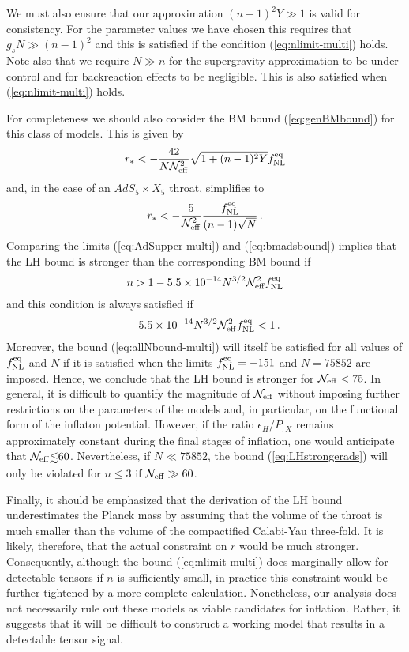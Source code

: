 {We must also ensure that our approximation $(n-1)^2Y \gg 1$ 
is valid for consistency.  
For the parameter values we have chosen this requires that 
$g_s N \gg  (n-1)^2$ 
and this is satisfied if the condition (\ref{eq:nlimit-multi}) 
holds. Note also that we require $N \gg n$ for the supergravity 
approximation to be under control and for backreaction effects to 
be negligible. This is also satisfied when (\ref{eq:nlimit-multi})  
holds. 


For completeness we should also consider the 
BM bound (\ref{eq:genBMbound}) for this class of models. This is given by 
% 
\begin{equation}
\label{eq:BMAdS-multi}
r_* < -\frac{42}{N \mathcal{N}_\mathrm{eff}^2}\sqrt{1 +(n-1)^2Y}f_{\mathrm{NL}}^{\mathrm{eq}} 
\end{equation}
%  
and, in the case of an $AdS_5 \times X_5$ throat, simplifies to
%  
\begin{equation}
\label{eq:bmadsbound}
r_* < -\frac{5}{\mathcal{N}_\mathrm{eff}^2} 
\frac{f_{\mathrm{NL}}^{\mathrm{eq}}}{(n-1)\sqrt{N}} \,.
\end{equation}
%  
Comparing the limits (\ref{eq:AdSupper-multi}) and (\ref{eq:bmadsbound}) 
implies that the LH bound is stronger than the corresponding BM bound if  
% 
\begin{equation}
\label{eq:LHstrongerads}
n > 1 -5.5 \times 10^{-14} N^{3/2} \mathcal{N}_\mathrm{eff}^2 f_{\mathrm{NL}}^{\mathrm{eq}} 
\end{equation}
% 
and this condition is always satisfied if 
% 
\begin{equation}
\label{eq:allNbound-multi}
-5.5 \times 10^{-14} N^{3/2} \mathcal{N}_\mathrm{eff}^2 f_{\mathrm{NL}}^{\mathrm{eq}}  <1  \, .
\end{equation}
% 
Moreover, the bound (\ref{eq:allNbound-multi}) will itself be satisfied for 
all values of $f_{\mathrm{NL}}^{\mathrm{eq}}$ and $N$ if it is satisfied when the limits 
$f_{\mathrm{NL}}^{\mathrm{eq}} =-151$ and $N=75852$ are imposed. Hence, we conclude that the LH bound 
is stronger for $\mathcal{N}_\mathrm{eff} < 75$. 
In general, it is difficult to quantify 
the magnitude of $\mathcal{N}_\mathrm{eff}$ without 
imposing further restrictions on the parameters of the models 
and, in particular, on the functional form of the inflaton potential. 
However, if the ratio $\epsilon_H/P_{,X}$ remains approximately 
constant during the final stages of inflation, one would anticipate that 
$\Neff \lsim 60$. Nevertheless, if $N \ll 75852$, the bound 
(\ref{eq:LHstrongerads}) will only be violated for $n \le 3$ if 
$\mathcal{N}_\mathrm{eff} \gg 60$.  


Finally, it should be emphasized that the derivation of the LH bound 
underestimates the Planck mass by assuming that 
the volume of the throat is much smaller 
than the volume of the compactified Calabi-Yau 
three-fold. It is likely, therefore, 
that the actual constraint on $r$ would be much stronger. Consequently, 
although the bound (\ref{eq:nlimit-multi})  
does marginally allow for detectable tensors if $n$ is sufficiently 
small, in practice this constraint would be further tightened by a more 
complete calculation. Nonetheless, our analysis does not necessarily 
rule out these models as viable candidates for inflation. Rather, it  
suggests that it will be difficult to construct a working model 
that results in a detectable tensor signal.   


}
